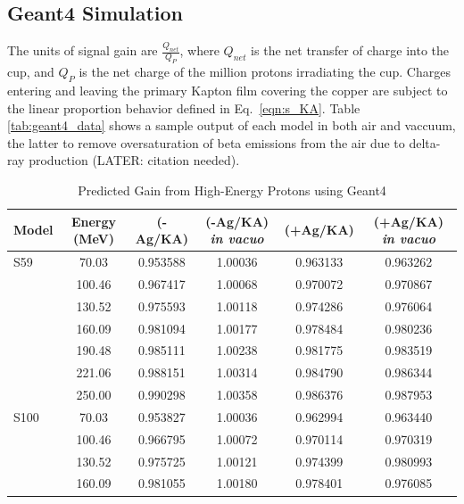 \documentclass{mc2015}
\begin{document}
\subsection{Geant4 Simulation}

The units of signal gain are $\frac{Q_{net}}{Q_P}$, where $Q_{net}$ is the net transfer of charge into the cup, and $Q_P$ is the net charge of the million protons irradiating the cup.  Charges entering and leaving the primary Kapton film covering the copper are subject to the linear proportion behavior defined in Eq.~\ref{eqn:s_KA}.  Table \ref{tab:geant4_data} shows a sample output of each model in both air and vaccuum, the latter to remove oversaturation of beta emissions from the air due to delta-ray production (LATER: citation needed).

\begin{table}[H]
  \centering
  \caption{Predicted Gain from High-Energy Protons using Geant4}
  \begin{tabular}{lccccc}
    \toprule
    Model & Energy (MeV) & (-Ag/KA) & (-Ag/KA) \emph{in vacuo} & (+Ag/KA) & (+Ag/KA) \emph{in vacuo} \\
    \midrule
    S59 & 70.03  & \num{0.953588} & \num{1.00036} & \num{0.963133} & \num{0.963262} \\
        & 100.46 & \num{0.967417} & \num{1.00068} & \num{0.970072} & \num{0.970867} \\
        & 130.52 & \num{0.975593} & \num{1.00118} & \num{0.974286} & \num{0.976064} \\
        & 160.09 & \num{0.981094} & \num{1.00177} & \num{0.978484} & \num{0.980236} \\
        & 190.48 & \num{0.985111} & \num{1.00238} & \num{0.981775} & \num{0.983519} \\
        & 221.06 & \num{0.988151} & \num{1.00314} & \num{0.984790} & \num{0.986344} \\
        & 250.00 & \num{0.990298} & \num{1.00358} & \num{0.986376} & \num{0.987953} \\
    \midrule
    S100 & 70.03 & \num{0.953827} & \num{1.00036} & \num{0.962994} & \num{0.963440} \\
        & 100.46 & \num{0.966795} & \num{1.00072} & \num{0.970114} & \num{0.970319} \\
        & 130.52 & \num{0.975725} & \num{1.00121} & \num{0.974399} & \num{0.980993} \\
        & 160.09 & \num{0.981055} & \num{1.00180} & \num{0.978401} & \num{0.976085} \\

\end{tabular}
\end{table}
\end{document}
